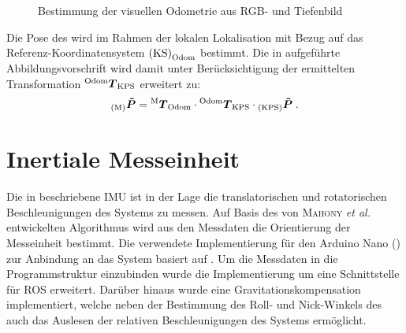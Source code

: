\begin{figure}[!ht]
	\begin{center}
	\hspace{5mm}
	\caption{Bestimmung der visuellen Odometrie aus RGB- und Tiefenbild}
	\label{fig.fovis}
	\end{center}
\end{figure}

Die Pose des  wird im Rahmen der lokalen Lokalisation mit Bezug auf das Referenz-Koordinatensystem ${\mathrm{(KS)}}_{\mathrm{Odom}}$ bestimmt. Die in  aufgeführte Abbildungsvorschrift wird damit unter Berücksichtigung der ermittelten Transformation ${^{\mathrm{Odom}}\mbox{\boldmath{$T$}}_{\mathrm{KPS}}}$ erweitert zu:
%
\begin{equation}
{_{{\mathrm{(M)}}}}\mbox{\boldmath{$\tilde{P}$}} = {^{\mathrm{M}}\mbox{\boldmath{$T$}}_{\mathrm{Odom}}} \cdot {^{\mathrm{Odom}}\mbox{\boldmath{$T$}}_{\mathrm{KPS}}} \cdot {_{{\mathrm{(KPS)}}}}\mbox{\boldmath{$\tilde{P}$}} \; \text{.}
\label{eq.locloc}
\end{equation}

\prever{
}
\prever{
}
\section{Inertiale Messeinheit}
Die in  beschriebene IMU ist in der Lage die translatorischen und rotatorischen Beschleunigungen des Systems zu messen. Auf Basis des von \textsc{Mahony} \textit{et al.} \cite{Mahony2008} entwickelten Algorithmus wird aus den Messdaten die Orientierung der Messeinheit bestimmt. Die verwendete Implementierung für den Arduino Nano () zur Anbindung an das System basiert auf \cite{IMUCode}. Um die Messdaten in die Programmstruktur einzubinden wurde die Implementierung um eine Schnittstelle für ROS erweitert. Darüber hinaus wurde eine Gravitationskompensation implementiert, welche neben der Bestimmung des Roll- und Nick-Winkels des  auch das Auslesen der relativen Beschleunigungen des Systems ermöglicht.\\

